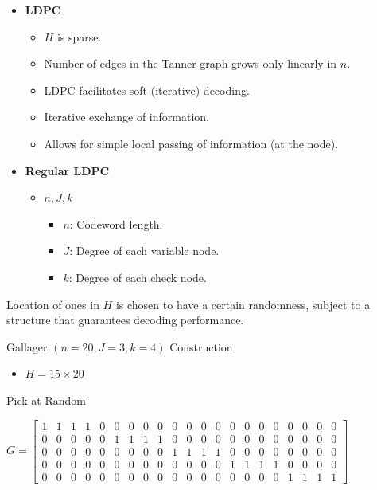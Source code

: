 \documentclass[11pt]{article}
\providecommand{\tightlist}{%
      \setlength{\itemsep}{0pt}\setlength{\parskip}{0pt}}
\begin{document}
    \begin{itemize}
\tightlist
\item
  \textbf{LDPC}

  \begin{itemize}
  \tightlist
  \item
    \(H\) is sparse.
  \item
    Number of edges in the Tanner graph grows only linearly in \(n\).
  \item
    LDPC facilitates soft (iterative) decoding.
  \item
    Iterative exchange of information.
  \item
    Allows for simple local passing of information (at the node).
  \end{itemize}
\item
  \textbf{Regular LDPC}

  \begin{itemize}
  \tightlist
  \item
    \(n, J, k\)

    \begin{itemize}
    \tightlist
    \item
      \(n\): Codeword length.
    \item
      \(J\): Degree of each variable node.
    \item
      \(k\): Degree of each check node.
    \end{itemize}
  \end{itemize}
\end{itemize}

Location of ones in \(H\) is chosen to have a certain randomness,
subject to a structure that guarantees decoding performance.

    Gallager \((n = 20, J = 3, k = 4 )\) Construction

\begin{itemize}
\tightlist
\item
  \(H = 15 \times 20\)
\end{itemize}

Pick at Random

\(G = \begin{bmatrix}
1 & 1 & 1 & 1 & 0 & 0 & 0 & 0 & 0 & 0 & 0 & 0 & 0 & 0 & 0 & 0 & 0 & 0 & 0 & 0 & 0 \\
0 & 0 & 0 & 0 & 0 & 1 & 1 & 1 & 1 & 0 & 0 & 0 & 0 & 0 & 0 & 0 & 0 & 0 & 0 & 0 & 0 \\
0 & 0 & 0 & 0 & 0 & 0 & 0 & 0 & 0 & 1 & 1 & 1 & 1 & 0 & 0 & 0 & 0 & 0 & 0 & 0 & 0 \\
0 & 0 & 0 & 0 & 0 & 0 & 0 & 0 & 0 & 0 & 0 & 0 & 0 & 1 & 1 & 1 & 1 & 0 & 0 & 0 & 0 \\
0 & 0 & 0 & 0 & 0 & 0 & 0 & 0 & 0 & 0 & 0 & 0 & 0 & 0 & 0 & 0 & 0 & 1 & 1 & 1 & 1
\end{bmatrix}\)
\end{document}
